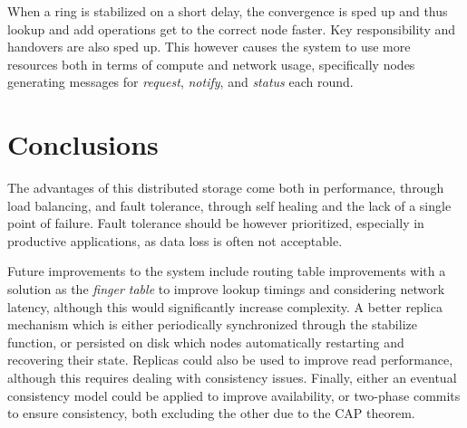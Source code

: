 \documentclass[a4paper, 11pt]{article}
\begin{document}
When a ring is stabilized on a short delay, the convergence is sped up and thus lookup and add operations get to the correct node faster. Key responsibility and handovers are also sped up.
This however causes the system to use more resources both in terms of compute and network usage, specifically nodes generating messages for \textit{request}, \textit{notify}, and \textit{status} each round.

\section{Conclusions}

The advantages of this distributed storage come both in performance, through load balancing, and fault tolerance, through self healing and the lack of a single point of failure.
Fault tolerance should be however prioritized, especially in productive applications, as data loss is often not acceptable.

Future improvements to the system include routing table improvements with a solution as the \textit{finger table} to improve lookup timings and considering network latency, although this would significantly increase complexity.
A better replica mechanism which is either periodically synchronized through the stabilize function, or persisted on disk which nodes automatically restarting and recovering their state. Replicas could also be used to improve read performance, although this requires dealing with consistency issues.
Finally, either an eventual consistency model could be applied to improve availability, or two-phase commits to ensure consistency, both excluding the other due to the CAP theorem.
\end{document}
